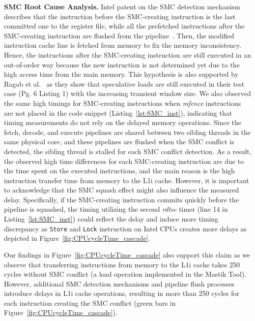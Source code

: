 \noindent \textbf{SMC Root Cause Analysis.} %
%
Intel patent on the SMC detection mechanism describes that the instruction before the SMC-creating instruction is the last committed one to the register file, while all the prefetched instructions after the SMC-creating instruction are flushed from the pipeline~\cite{intel_smc}. Then, the modified instruction cache line is fetched from memory to fix the memory inconsistency. Hence, the instructions after the SMC-creating instruction are still executed in an out-of-order way because the new instruction is not determined yet due to the high access time from the main memory. This hypothesis is also supported by Ragab et al.~\cite{ragab2021rage} as they show that speculative loads are still executed in their test case (Pg. 6 Listing 1) with the increasing transient window size.
We also observed the same high timings for SMC-creating instructions when \textit{mfence} instructions are not placed in the code snippet (Listing~\ref{lst:SMC_inst}), indicating that timing measurements do not rely on the delayed memory operations. Since the fetch, decode, and execute pipelines are shared between two sibling threads in the same physical core, and these pipelines are flushed when the SMC conflict is detected, the sibling thread is stalled for each SMC conflict detection. As a result, the observed high time differences for each SMC-creating instruction are due to the time spent on the executed instructions, and the main reason is the high instruction transfer time from memory to the L1i cache.
However, it is important to acknowledge that the SMC squash effect might also influence the measured delay. Specifically, if the SMC-creating instruction commits quickly before the pipeline is squashed, the timing utilizing the second \textit{rdtsc} timer (line 14 in Listing~\ref{lst:SMC_inst}) could reflect the delay and induce more timing discrepancy as \texttt{Store} and \texttt{Lock} instruction on Intel CPUs creates more delays as depicted in Figure~\ref{fig:CPUcycleTime_cascade}.

Our findings in Figure~\ref{fig:CPUcycleTime_cascade} also support this claim as we observe that transferring instructions from memory to the L1i cache takes 250 cycles without SMC conflict (a load operation implemented in the Mastik Tool). However, additional SMC detection mechanisms and pipeline flush processes introduce delays in L1i cache operations, resulting in more than 250 cycles for each instruction creating the SMC conflict (green bars in Figure~\ref{fig:CPUcycleTime_cascade}).


